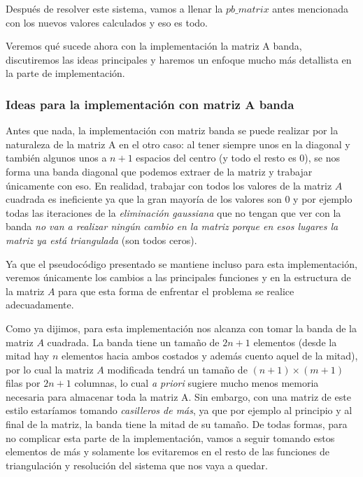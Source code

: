 \vspace{\baselineskip}

Después de resolver este sistema, vamos a llenar la $pb\_matrix$ antes mencionada con los nuevos valores calculados y eso es todo.

\vspace{\baselineskip}

\vspace{\baselineskip}
\par
Veremos qué sucede ahora con la implementación la matriz A banda, discutiremos las ideas principales y haremos un enfoque mucho más detallista en la parte de implementación.

\subsubsection{Ideas para la implementación con matriz A banda}

Antes que nada, la implementación con matriz banda se puede realizar por la naturaleza de la matriz A en el otro caso: al tener siempre unos en la diagonal y también algunos unos a $n+1$ espacios del centro (y todo el resto es 0), se nos forma una banda diagonal que podemos extraer de la matriz y trabajar únicamente con eso. En realidad, trabajar con todos los valores de la matriz $A$ cuadrada es ineficiente ya que la gran mayoría de los valores son 0 y por ejemplo todas las iteraciones de la \textit{eliminación gaussiana} que no tengan que ver con la banda \textit{no van a realizar ningún cambio en la matriz porque en esos lugares la matriz ya está triangulada} (son todos ceros).

Ya que el pseudocódigo presentado se mantiene incluso para esta implementación, veremos únicamente los cambios a las principales funciones y en la estructura de la matriz $A$ para que esta forma de enfrentar el problema se realice adecuadamente.

\vspace{\baselineskip}

Como ya dijimos, para esta implementación nos alcanza con tomar la banda de la matriz $A$ cuadrada. La banda tiene un tamaño de $2n+1$ elementos (desde la mitad hay $n$ elementos hacia ambos costados y además cuento aquel de la mitad), por lo cual la matriz $A$ modificada tendrá un tamaño de $(n+1) \times (m+1)$ filas por $2n+1$ columnas, lo cual \textit{a priori} sugiere mucho menos memoria necesaria para almacenar toda la matriz A. Sin embargo, con una matriz de este estilo estaríamos tomando \textit{casilleros de más}, ya que por ejemplo al principio y al final de la matriz, la banda tiene la mitad de su tamaño. De todas formas, para no complicar esta parte de la implementación, vamos a seguir tomando estos elementos de más y solamente los evitaremos en el resto de las funciones de triangulación y resolución del sistema que nos vaya a quedar.

